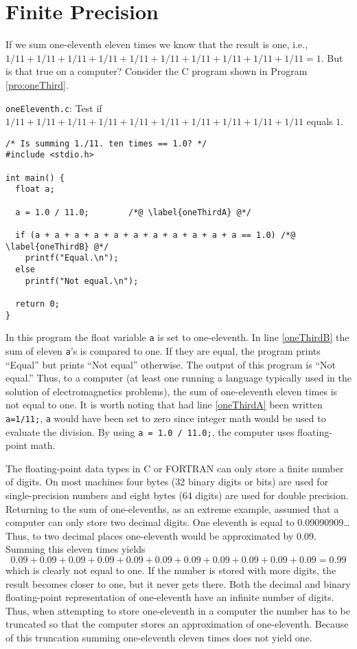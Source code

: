 \section{Finite Precision}

If we sum one-eleventh eleven times we know that the result is one,
i.e., $1/11+1/11+1/11+1/11+1/11+1/11+1/11+1/11+1/11+1/11=1$.  But is
that true on a computer?  Consider the C program shown in Program
\ref{pro:oneThird}.
\begin{program}
{\tt oneEleventh.c}: 
Test if $1/11+1/11+1/11+1/11+1/11+1/11+1/11+1/11+1/11+1/11$ equals $1$. \label{pro:oneThird}
\codemiddle
\begin{lstlisting}
/* Is summing 1./11. ten times == 1.0? */
#include <stdio.h>

int main() {
  float a;

  a = 1.0 / 11.0;        /*@ \label{oneThirdA} @*/

  if (a + a + a + a + a + a + a + a + a + a + a == 1.0) /*@ \label{oneThirdB} @*/
    printf("Equal.\n");
  else
    printf("Not equal.\n");

  return 0;
}
\end{lstlisting}
\end{program}
In this program the float variable {\tt a} is set to one-eleventh.  In
line \ref{oneThirdB} the sum of eleven {\tt a}'s is compared to one.
If they are equal, the program prints ``Equal'' but prints ``Not
equal'' otherwise.  The output of this program is ``Not equal.''
Thus, to a computer (at least one running a language typically used in
the solution of electromagnetics problems),
the sum of one-eleventh eleven times is not equal to
one.  It is worth noting that had line \ref{oneThirdA} been written
{\tt a=1/11;}, {\tt a} would have been set to zero since integer math
would be used to evaluate the division.  By using {\tt a = 1.0 /
  11.0;}, the computer uses floating-point math.

The floating-point data types in C or FORTRAN can only store a finite
number of digits.  On most machines four bytes (32 binary digits or
bits) are used for single-precision numbers and eight bytes (64
digits) are used for double precision.  Returning to the sum of
one-elevenths, as an extreme example, assumed that a computer can only
store two decimal digits.  One eleventh is equal to 0.09090909\ldots
Thus, to two decimal places one-eleventh would be approximated by
0.09.  Summing this eleven times yields
\[
0.09 + 0.09 + 0.09 + 0.09 + 0.09 + 0.09 + 0.09 + 0.09 + 0.09 + 0.09 +
0.09 = 0.99
\]
which is clearly not equal to one.  If the number is stored with more
digits, the result becomes closer to one, but it never gets there.
Both the decimal and binary floating-point representation of
one-eleventh have an infinite number of digits.  Thus, when attempting
to store one-eleventh in a computer the number has to be truncated so
that the computer stores an approximation of one-eleventh.  Because of
this truncation summing one-eleventh eleven times does not yield one.


